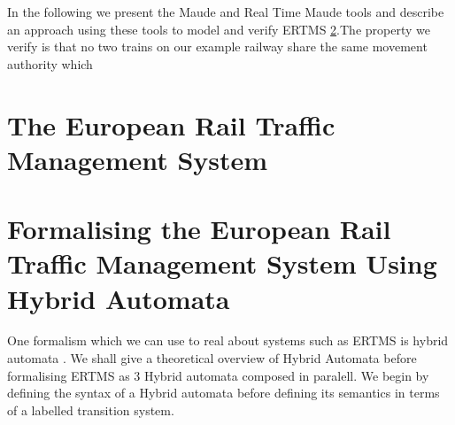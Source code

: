 \newcommand{\rtmaude}{Real Time Maude}

In the following we present the Maude \cite{MC03,Maude} and Real Time Maude \cite{PO02,PO04,RTMaude} tools and describe an approach using these tools to model and verify ERTMS \ref{}.The property we verify is that no two trains on our example railway share the same movement authority which 


\section{The European Rail Traffic Management System}

\section{Formalising the European Rail Traffic Management System Using Hybrid Automata}
One formalism which we can use to real about systems such as ERTMS is hybrid automata \cite{TH96}. We shall give a theoretical overview of Hybrid Automata before formalising ERTMS as 3 Hybrid automata composed in paralell.
We begin by defining the syntax of a Hybrid automata before defining its semantics in terms of a labelled transition system.
